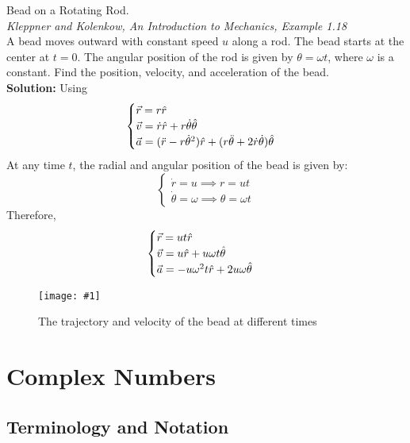 \documentclass[11pt]{article}
\newcommand{\fig}[4]{
    \begin{figure}[H]
        \centering
        \texttt{[image: \#1]}
        \caption{#2}
        \label{exp4fit}
    \end{figure}
}
\theoremstyle{gangnamstyle}{\newtheorem{definition}{Definition}[]}
\theoremstyle{gangnamstyle}{\newtheorem{example}{Example}[]}
\theoremstyle{gangnamstyle}{\newtheorem{problem}{Problem}[]}
\begin{document}
\begin{example}
Bead on a Rotating Rod. \\ 
\textit{Kleppner and Kolenkow, An Introduction to Mechanics, Example 1.18} \\
A bead moves outward with constant speed $u$ along a rod. The bead starts at the center at $t = 0$. The angular position of the rod is given by $\theta = \omega t$, where $\omega$ is a constant. Find the position, velocity, and acceleration of the bead. \\

\textbf{Solution:} Using
\[ \begin{cases}
\Vec{r} = r\Hat{r} \\
\Vec{v} = \Dot{r}\Hat{r} + r\Dot{\theta}\Hat{\theta} \\
\Vec{a} = (\Ddot{r} - r\Dot{\theta}^2)\Hat{r} + (r\Ddot{\theta} + 2\Dot{r}\Dot{\theta})\Hat{\theta}
\end{cases}\]
At any time $t$, the radial and angular position of the bead is given by: 
\[ \begin{cases}
\Dot{r} = u \implies r = ut \\
\Dot{\theta} = \omega \implies\theta = \omega t
\end{cases} \]
Therefore, 
\[ \begin{cases}
\Vec{r} = ut\Hat{r} \\
\Vec{v} = u\Hat{r} + u\omega t\Hat{\theta} \\
\Vec{a} = -u\omega^2t\Hat{r} + 2u\omega\Hat{\theta}
\end{cases} \]

\fig{figs/n0/ex1.jpg}{The trajectory and velocity of the bead at different times}{0.5}{0}
\end{example}

\pagebreak

\section{Complex Numbers}

\subsection{Terminology and Notation}
\end{document}
